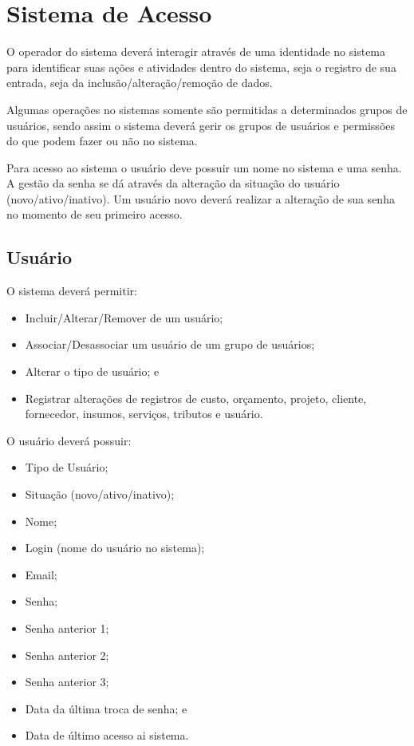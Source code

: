 \chapter{Sistema de Acesso}

O operador do sistema deverá interagir através de uma identidade no sistema para identificar suas ações e atividades dentro do sistema, seja o registro de sua entrada, seja da inclusão/alteração/remoção de dados.

Algumas operações no sistemas somente são permitidas a determinados grupos de usuários, sendo assim o sistema deverá gerir os grupos de usuários e permissões do que podem fazer ou não no sistema.

Para acesso ao sistema o usuário deve possuir um nome no sistema e uma senha. A gestão da senha se dá através da alteração da situação do usuário (novo/ativo/inativo). Um usuário novo deverá realizar a alteração de sua senha no momento de seu primeiro acesso.

\section{Usuário}

O sistema deverá permitir:

\begin{itemize}
	\item Incluir/Alterar/Remover de um usuário;
	\item Associar/Desassociar um usuário de um grupo de usuários;
	\item Alterar o tipo de usuário; e
	\item Registrar alterações de registros de custo, orçamento, projeto, cliente, fornecedor, insumos, serviços, tributos e usuário.
\end{itemize}

O usuário deverá possuir:

\begin{itemize}
	\item Tipo de Usuário;
	\item Situação (novo/ativo/inativo);
	\item Nome;
	\item Login (nome do usuário no sistema);
	\item Email;
	\item Senha;
	\item Senha anterior 1;
	\item Senha anterior 2;
	\item Senha anterior 3;
	\item Data da última troca de senha; e
	\item Data de último acesso ai sistema.
\end{itemize}


